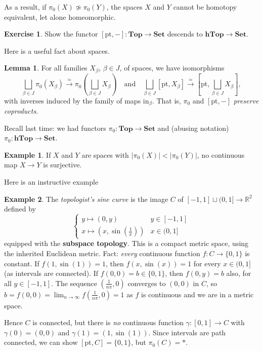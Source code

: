 \documentclass{tufte-handout}
\def\pt {\mathrm{pt}}
\def\Set {\mathbf{Set}}
\def\Top {\mathbf{Top}}
\def\Ho {\mathbf{hTop}}
\def\RR{\mathbb{R}}
\theoremstyle{definition}
\newtheorem{lemma}{Lemma}
\newtheorem{example}{Example}
\newtheorem{ex}{Exercise}
\begin{document}
As a result, if $\pi_0(X) \not\simeq \pi_0(Y)$, the spaces $X$ and $Y$ cannot be homotopy equivalent, let alone homeomorphic.

\begin{ex}
Show the functor $[\pt,-]\colon \Top\to \Set$ descends to $\Ho\to\Set$.
\end{ex}

Here is a useful fact about spaces.

\begin{lemma}\label{lemma:pi0s_preserve_coprods}
For all families $X_\beta$, $\beta\in J$, of spaces, we have isomorphisms
\[
	\bigsqcup_{\beta\in J} \pi_0(X_\beta) \xrightarrow{\simeq}
	\pi_0(\bigsqcup_{\beta\in J} X_\beta)
	\quad\text{and}\quad
	\bigsqcup_{\beta\in J} [\pt,X_\beta] \xrightarrow{\simeq}
	[\pt,\bigsqcup_{\beta\in J} X_\beta],
\]
with inverses induced by the family of maps $\mathrm{in}_\beta$. 
That is, $\pi_0$ and $[\pt,-]$ \emph{preserve coproducts}.
\end{lemma}



Recall last time:\marginnote{$\xymatrix{\Top\ar[d] \ar[r]^{\pi_0}&\Set\\ \Ho\ar[ur]_{\pi_0}}$} 
we had functors $\pi_0\colon \Top\to \Set$ and (abusing notation) $\pi_0\colon \Ho\to \Set$.

\begin{example}
If $X$ and $Y$ are spaces with $|\pi_0(X)|< |\pi_0(Y)|$, no continuous map $X\to Y$ is 
surjective.
\end{example}

Here is an instructive example

\begin{example}

The \emph{topologist's sine curve} is the image $C$ of $[-1,1]\sqcup (0,1]\to \RR^2$ defined by
\[\begin{cases}
	y \mapsto (0,y) & y\in [-1,1]\\
	x \mapsto (x,\sin(\tfrac{1}{x})) & x\in (0,1]
\end{cases}\]
equipped with the \textbf{subspace topology}. This is a compact metric space, using the 
inherited Euclidean metric. Fact: \emph{every} continuous function $f\colon C\to \{0,1\}$ is constant.
If $f(1,\sin(1))=1$, then $f(x,\sin(x))=1$ for every $x\in (0,1]$ (as intervals are connected).
If $f(0,0)=b \in \{0,1\}$, then $f(0,y) = b$ also, for all $y\in [-1,1]$.
The sequence $(\frac{1}{n\pi},0)$ converges to $(0,0)$ in $C$, so 
$b = f(0,0) = \lim_{n\to\infty} f(\frac{1}{n\pi},0) = 1$ as $f$ is continuous and we are in a metric space.

Hence $C$ is connected, but there is \emph{no} continuous function $\gamma\colon [0,1]\to C$ with 
$\gamma(0)=(0,0)$ and $\gamma(1) = (1,\sin(1))$. Since intervals are path connected, we can 
show $[\pt,C]=\{0,1\}$, but $\pi_0(C)=*$.
\end{example}
\end{document}

